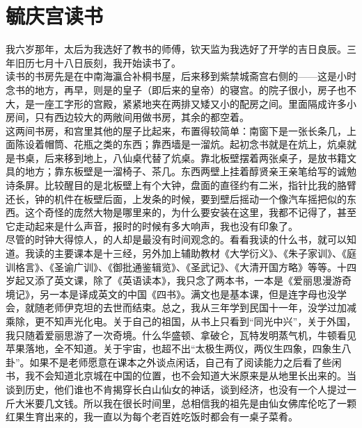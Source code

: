 \fancyhead[RO]{} %
\fancyhead[LE]{} %
\chapter*{毓庆宫读书}
\thispagestyle{empty}
我六岁那年，太后为我选好了教书的师傅，钦天监为我选好了开学的吉日良辰。三年旧历七月十八日辰刻，我开始读书了。\\

读书的书房先是在中南海瀛合补桐书屋，后来移到紫禁城斋宫右侧的——这是小时念书的地方，再早，则是的皇子（即后来的皇帝）的寝宫。的院子很小，房子也不大，是一座工字形的宫殿，紧紧地夹在两排又矮又小的配房之间。里面隔成许多小房间，只有西边较大的两敞间用做书房，其余的都空着。\\

这两间书房，和宫里其他的屋子比起来，布置得较简单：南窗下是一张长条几，上面陈设着帽筒、花瓶之类的东西；靠西墙是一溜炕。起初念书就是在炕上，炕桌就是书桌，后来移到地上，八仙桌代替了炕桌。靠北板壁摆着两张桌子，是放书籍文具的地方；靠东板壁是一溜椅子、茶几。东西两壁上挂着醇贤亲王亲笔给写的诚勉诗条屏。比较醒目的是北板壁上有个大钟，盘面的直径约有二米，指针比我的胳臂还长，钟的机件在板壁后面，上发条的时候，要到壁后摇动一个像汽车摇把似的东西。这个奇怪的庞然大物是哪里来的，为什么要安装在这里，我都不记得了，甚至它走动起来是什么声音，报时的时候有多大响声，我也没有印象了。\\

尽管的时钟大得惊人，的人却是最没有时间观念的。看看我读的什么书，就可以知道。我读的主要课本是十三经，另外加上辅助教材《大学衍义》、《朱子家训》、《庭训格言》、《圣谕广训》、《御批通鉴辑览》、《圣武记》、《大清开国方略》等等。十四岁起又添了英文课，除了《英语读本》，我只念了两本书，一本是《爱丽思漫游奇境记》，另一本是译成英文的中国《四书》。满文也是基本课，但是连字母也没学会，就随老师伊克坦的去世而结束。总之，我从三年学到民国十一年，没学过加减乘除，更不知声光化电。关于自己的祖国，从书上只看到“同光中兴”，关于外国，我只随着爱丽思游了一次奇境。什么华盛顿、拿破仑，瓦特发明蒸气机，牛顿看见苹果落地，全不知道。关于宇宙，也超不出“太极生两仪，两仪生四象，四象生八卦”。如果不是老师愿意在课本之外谈点闲话，自己有了阅读能力之后看了些闲书，我不会知道北京城在中国的位置，也不会知道大米原来是从地里长出来的。当谈到历史，他们谁也不肯揭穿长白山仙女的神话，谈到经济，也没有一个人提过一斤大米要几文钱。所以我在很长时间里，总相信我的祖先是由仙女佛库伦吃了一颗红果生育出来的，我一直以为每个老百姓吃饭时都会有一桌子菜肴。\\


